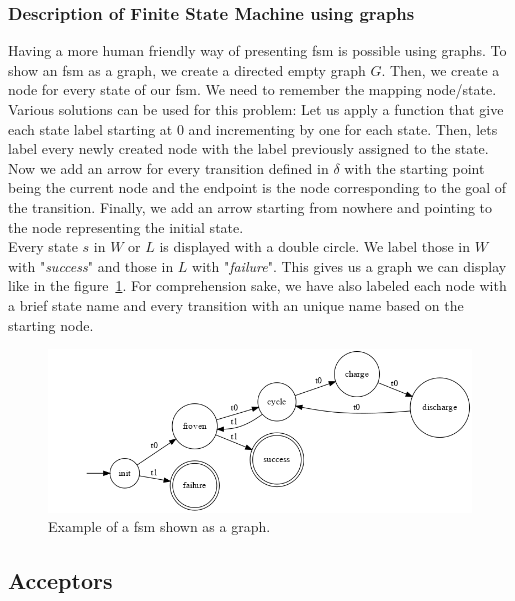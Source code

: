 \documentclass[12pt]{article}
\theoremstyle{definition}
\theoremstyle{definition}
\begin{document}
\subsubsection{Description of Finite State Machine using graphs}

Having a more human friendly way of presenting \gls{fsm} is possible using graphs. To show an \gls{fsm} as a graph, we create a directed empty graph $G$. Then, we create a node for every state of our \gls{fsm}. We need to remember the mapping node/state. Various solutions can be used for this problem: Let us apply a function that give each state label starting at 0 and incrementing by one for each state. Then, lets label every newly created node with the label previously assigned to the state.\\

Now we add an arrow for every transition defined in $\delta$ with the starting point being the current node and the endpoint is the node corresponding to the goal of the transition. Finally, we add an arrow starting from nowhere and pointing to the node representing the initial state.\\

Every state $s$ in $W$ or $L$ is displayed with a double circle. We label those in $W$ with "\textit{success}" and those in $L$ with "\textit{failure}". This gives us a graph we can display like in the figure~\ref{battcycle}. For comprehension sake, we have also labeled each node with a brief state name and every transition with an unique name based on the starting node.

\begin{figure}
    \centering
    \includegraphics[scale=0.4]{graph/BatteryCycle.png}
    \caption{Example of a \gls{fsm} shown as a graph.}
    \label{battcycle}
\end{figure}

\subsection{Acceptors}
\end{document}
